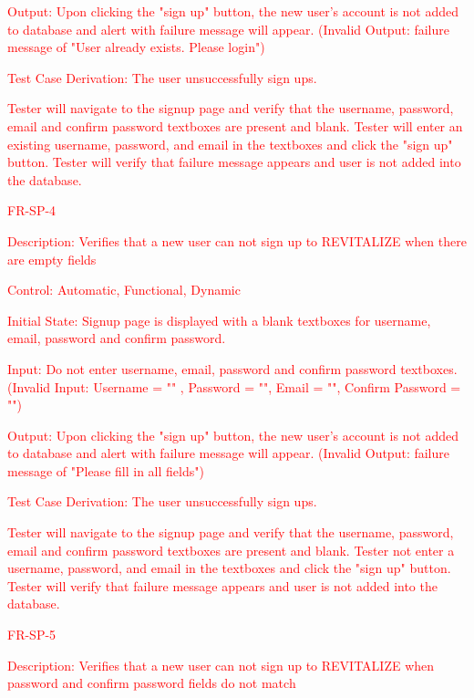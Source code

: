 \documentclass[12pt, titlepage]{article}
\begin{document}
\begin{enumerate}
	\textcolor{red}{Output: Upon clicking the "sign up" button, the new user's account is not added to database and alert with failure message will appear. (Invalid Output: failure message of "User already exists. Please login")}
	
	\textcolor{red}{Test Case Derivation: The user unsuccessfully sign ups.}
	
	\textcolor{red}{\textcolor{red}{Tester will navigate to the signup page and verify that the username, password, email and confirm password textboxes are present and blank. Tester will enter an existing username, password, and email in the textboxes and click the "sign up" button. Tester will verify that failure message appears and user is not added into the database.}}

 \textcolor{red}{\item{FR-SP-4\\}}

        \textcolor{red}{Description: Verifies that a new user can not sign up to REVITALIZE when there are empty fields}
	
	\textcolor{red}{Control: Automatic, Functional, Dynamic}
	
	\textcolor{red}{Initial State: Signup page is displayed with a blank textboxes for username, email, password and confirm password.}
	
	\textcolor{red}{Input: Do not enter username, email, password and confirm password textboxes. (Invalid Input: Username = "" , Password = "", Email = "", Confirm Password = "")}
	
	\textcolor{red}{Output: Upon clicking the "sign up" button, the new user's account is not added to database and alert with failure message will appear. (Invalid Output: failure message of "Please fill in all fields")}
	
	\textcolor{red}{Test Case Derivation: The user unsuccessfully sign ups.}
	
	\textcolor{red}{\textcolor{red}{Tester will navigate to the signup page and verify that the username, password, email and confirm password textboxes are present and blank. Tester not enter a username, password, and email in the textboxes and click the "sign up" button. Tester will verify that failure message appears and user is not added into the database.}}

  \textcolor{red}{\item{FR-SP-5\\}}

        \textcolor{red}{Description: Verifies that a new user can not sign up to REVITALIZE when password and confirm password fields do not match}
	

\end{enumerate}
\end{document}
